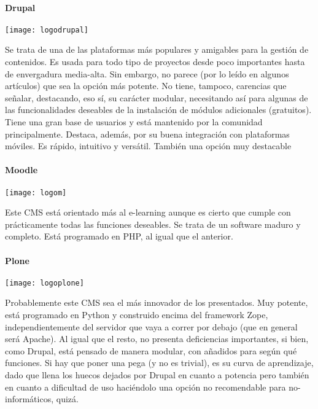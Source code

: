 \paragraph{Drupal}
\texttt{[image: logodrupal]}
\par Se trata de una de las plataformas más populares y amigables para la gestión de contenidos.
Es usada para todo tipo de proyectos desde poco importantes hasta de envergadura media-alta. Sin embargo, no parece (por lo leído en algunos artículos) que sea la opción más potente.
No tiene, tampoco, carencias que señalar, destacando, eso sí, su carácter modular, necesitando así para algunas de las funcionalidades deseables de la instalación de módulos adicionales (gratuitos). Tiene una gran base de usuarios y está mantenido por la comunidad principalmente. Destaca, además, por su buena integración con plataformas móviles.
Es rápido, intuitivo y versátil. También una opción muy destacable

\paragraph{Moodle}
\texttt{[image: logom]}
\par Este CMS está orientado más al e-learning aunque es cierto que cumple con prácticamente todas las funciones deseables.
Se trata de un software maduro y completo.
Está programado en PHP, al igual que el anterior.

\paragraph{Plone}
\texttt{[image: logoplone]}
\par Probablemente este CMS sea el más innovador de los presentados. Muy potente, está programado en Python y construido encima del framework Zope, independientemente del servidor que vaya a correr por debajo (que en general será Apache).
Al igual que el resto, no presenta deficiencias importantes, si bien, como Drupal, está pensado de manera modular, con añadidos para según qué funciones.
Si hay que poner una pega (y no es trivial), es su curva de aprendizaje, dado que llena los huecos dejados por Drupal en cuanto a potencia pero también en cuanto a dificultad de uso haciéndolo una opción no recomendable para no-informáticos, quizá.

